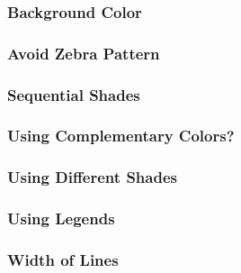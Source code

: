 \documentclass[12pt]{beamer}\usepackage[]{graphicx}\usepackage[]{color}
\begin{document}
\begin{frame}
\frametitle{Background Color}
\begin{center}
\end{center}
\end{frame}


\begin{frame}
\frametitle{Avoid Zebra Pattern}
\begin{center}
\end{center}
\end{frame}


\begin{frame}
\frametitle{Sequential Shades}
\begin{center}
\end{center}
\end{frame}


\begin{frame}
\frametitle{Using Complementary Colors?}
\begin{center}
\end{center}
\end{frame}


\begin{frame}
\frametitle{Using Different Shades}
\begin{center}
\end{center}
\end{frame}


\begin{frame}
\frametitle{Using Legends}
\begin{center}
\end{center}
\end{frame}


\begin{frame}
\frametitle{Width of Lines}
\begin{center}
\end{center}
\end{frame}
\end{document}
